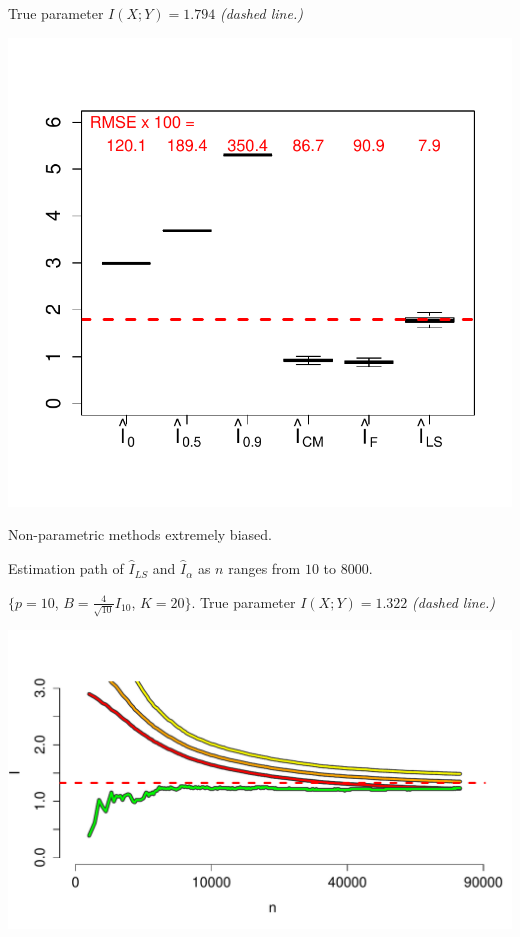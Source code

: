 \documentclass[12pt]{article}
\begin{document}
True parameter $I(X; Y) = 1.794$ \emph{(dashed line.)}
\begin{center}
\includegraphics[scale = 0.5, clip = true, trim = 0 0.5in 0 0.5in]{../info_theory_sims/fig2.pdf}
\end{center}
Non-parametric methods extremely biased.

Estimation path of $\hat{I}_{LS}$ and $\hat{I}_\alpha$ as $n$ ranges from $10$ to $8000$.

\small{$\{p = 10$, $B = \frac{4}{\sqrt{10}} I_{10}$, $K = 20\}$.
True parameter $I(X; Y) = 1.322$ \emph{(dashed line.)}}

\begin{center}
\includegraphics[scale = 0.4]{../info_theory_sims/fig3.pdf}
\end{center}
\end{document}
